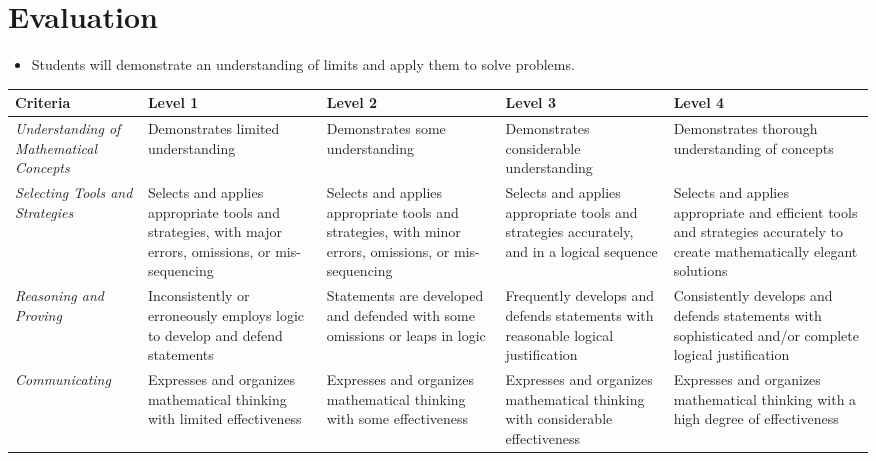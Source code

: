 \documentclass[12pt]{book}
\begin{document}
\section*{Evaluation}

\begin{itemize}
\item Students will demonstrate an understanding of limits and apply them to solve problems.
\end{itemize}

\begin{tabular}{| C{2in} | C{1in} | C{1in} | C{1in} | C{1in} |}
\hline
\textbf{Criteria} & \textbf{Level 1} & \textbf{Level 2} & \textbf{Level 3} & \textbf{Level 4} \\
\hline
\emph{Understanding of Mathematical Concepts} & Demonstrates limited understanding & Demonstrates some understanding & Demonstrates considerable understanding & Demonstrates thorough understanding of concepts \\
\hline
\emph{Selecting Tools and Strategies} & Selects and applies appropriate tools and strategies, with major errors, omissions, or mis-sequencing & Selects and applies appropriate tools and strategies, with minor errors, omissions, or mis-sequencing & Selects and applies appropriate tools and strategies accurately, and in a logical sequence & Selects and applies appropriate and efficient tools and strategies accurately to create mathematically elegant solutions \\
\hline
\emph{Reasoning and Proving} & Inconsistently or erroneously employs logic to develop and defend statements & Statements are developed and defended with some omissions or leaps in logic & Frequently develops and defends statements with reasonable logical justification & Consistently develops and defends statements with sophisticated and/or complete logical justification \\
\hline
\emph{Communicating} & Expresses and organizes mathematical thinking with limited effectiveness & Expresses and organizes mathematical thinking with some effectiveness & Expresses and organizes mathematical thinking with considerable effectiveness & Expresses and organizes mathematical thinking with a high degree of effectiveness \\
\hline
\end{tabular}

\pagebreak



\end{document}
